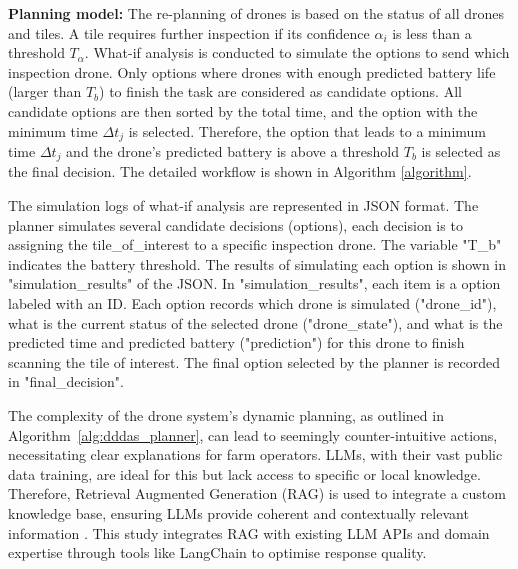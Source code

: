 \documentclass[runningheads]{llncs}
\begin{document}
\noindent\textbf{Planning model:} The re-planning of drones is based on the status of all drones and tiles.
A tile requires further inspection if its confidence $\alpha_i$ is less than a threshold $T_\alpha$.
What-if analysis is conducted to simulate the options to send which inspection drone. 
Only options where drones with enough predicted battery life (larger than $T_b$) to finish the task are considered as candidate options.
All candidate options are then sorted by the total time, and the option with the minimum time $\Delta t_j$ is selected.
Therefore, the option that leads to a minimum time $\Delta t_j$ and the drone's predicted battery is above a threshold $T_b$ is selected as the final decision. 
The detailed workflow is shown in  Algorithm \ref{algorithm}.



The simulation logs of what-if analysis are represented in JSON format.
The planner simulates several candidate decisions (options), each decision is to assigning the tile_of_interest to a specific inspection drone. 
The variable "T_b" indicates the battery threshold. 
The results of simulating each option is shown in "simulation_results" of the JSON. In "simulation_results", each item is a option labeled with an ID. Each option records which drone is simulated ("drone_id"), what is the current status of the selected drone ("drone_state"), and what is the predicted time and predicted battery ("prediction") for this drone to finish scanning the tile of interest.
The final option selected by the planner is recorded in "final_decision". 



The complexity of the drone system's dynamic planning, as outlined in Algorithm~\ref{alg:dddas_planner}, can lead to seemingly counter-intuitive actions, necessitating clear explanations for farm operators. LLMs, with their vast public data training, are ideal for this but lack access to specific or local knowledge. Therefore, Retrieval Augmented Generation (RAG) is used to integrate a custom knowledge base, ensuring LLMs provide coherent and contextually relevant information \cite{rag_amazon}. 
This study integrates RAG with existing LLM APIs and domain expertise through tools like LangChain \cite{langchain} to optimise response quality.
\end{document}
